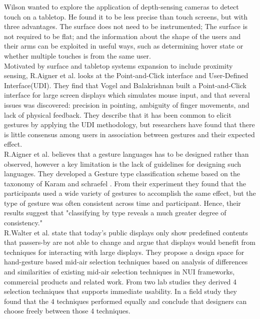 Wilson \cite{Wilson:2010} wanted to explore the application of depth-sensing cameras to detect touch on a tabletop. He found it to be less precise than touch screens, but with three advantages. The surface does not need to be instrumented; The surface is not required to be flat; and the information about the shape of the users and their arms can be exploited in useful ways, such as determining hover state or whether multiple touches is from the same user. \cite{Wilson:2010}\\


Motivated by surface and tabletop systems expansion to include proximity sensing, R.Aigner et al.\cite{Aigner:2012} looks at the Point-and-Click interface and User-Defined Interface(UDI). They find that Vogel and Balakrishnan \cite{Vogel:2005} built a Point-and-Click interface for large screen displays which simulates mouse input, and that several issues was discovered: precision in pointing, ambiguity of finger movements, and lack of physical feedback. They describe that it has been common to elicit gestures by applying the UDI methodology, but researchers have found that there is little consensus among users in association between gestures and their expected effect.\\
R.Aigner et al.\cite{Aigner:2012} believes that a gesture languages has to be designed rather than observed, however a key limitation is the lack of guidelines for designing such languages.
They developed a Gesture type classification scheme based on the taxonomy of Karam and schraefel \cite{Karam:2005} .
From their experiment they found that the participants used  a  wide  variety  of  gestures  to accomplish  the  same  effect, but the  type  of  gesture was  often  consistent  across  time and participant. Hence, their results suggest that "classifying by type reveals a much greater degree of consistency." 
\\
R.Walter et al.\cite{Walter:2014} state that today's public displays only show predeﬁned contents that passers-by are not able to change and argue that displays would beneﬁt from techniques for interacting with large displays. They propose a design space for hand-gesture based mid-air selection techniques based on analysis of differences and similarities of existing mid-air selection techniques in NUI frameworks, commercial products and related work. From two lab studies they derived 4 selection techniques that supports immediate usability. In a field study they found that the 4 techniques performed equally and conclude that designers can choose freely between those 4 techniques.\\
